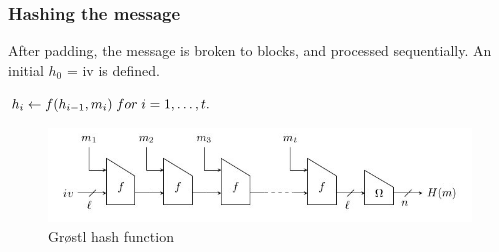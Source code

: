 \documentclass{beamer}
\begin{document}

\begin{frame}
\frametitle{Hashing the message}
After padding, the message is broken to blocks, and processed sequentially. An initial $h_{0}$ = iv is defined.
\begin{center}$ h_{i}\gets f(h_{i-1}, m_{i})\thickspace for \thickspace i = 1,\ldots, t.$\end{center}
\begin{figure}
  \begin{center}
    \includegraphics[scale=0.4]{groestlhashfunction.jpg}
  \end{center}
  \caption{Gr{\o}stl hash function \footnotemark}
  \label{fig:lab}
\end{figure}
\end{frame}
\end{document}
